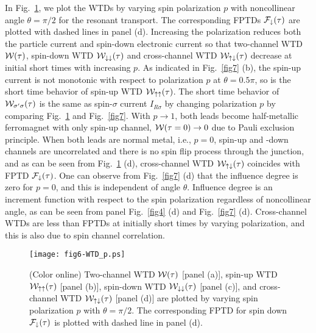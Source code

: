 \documentclass[aps,prb,twocolumn,footinbib,showpacs,superscriptaddress,preprintnumbers,amsmath,amssymb]{revtex4-1}
\begin{document}
	In Fig.~\ref{fig6}, we plot the WTDs by varying spin polarization $p$ with noncollinear angle $\theta=\pi/2$ for the resonant transport. The corresponding FPTDs ${\cal F}_{\downarrow}(\tau)$ are plotted with dashed lines in panel (d). Increasing the polarization reduces both the particle current and spin-down electronic current so that two-channel WTD ${\cal W}(\tau)$, spin-down WTD ${\cal W}_{\downarrow\downarrow}(\tau)$ and cross-channel WTD ${\cal W}_{\uparrow\downarrow}(\tau)$ decrease at initial short times with increasing $p$. As indicated in Fig.~\ref{fig7} (b), the spin-up current is not monotonic with respect to polarization $p$ at $\theta=0.5\pi$, so is the short time behavior of spin-up WTD ${\cal W}_{\uparrow\uparrow}(\tau)$. The short time behavior of ${\cal W}_{\sigma'\sigma}(\tau)$ is the same as spin-$\sigma$ current $I_{R\sigma}$ by changing polarization $p$ by comparing Fig.~\ref{fig6} and Fig.~\ref{fig7}. 
	With $p\rightarrow 1$, both leads become half-metallic ferromagnet with only spin-up channel, ${\cal W}(\tau=0) \rightarrow 0$ due to Pauli exclusion principle. When both leads are normal metal, i.e., $p=0$, spin-up and -down channels are uncorrelated and there is no spin flip process through the junction, and as can be seen from Fig.~\ref{fig6} (d), cross-channel WTD ${\cal W}_{\uparrow\downarrow}(\tau)$ coincides with FPTD ${\cal F}_{\downarrow}(\tau)$. One can observe from  Fig.~\ref{fig7} (d) that the influence degree is zero for $p=0$, and this is independent of angle $\theta$. 
	Influence degree is an increment function with respect to the spin polarization regardless of noncollinear angle, as can be seen from panel Fig.~\ref{fig4} (d) and Fig.~\ref{fig7} (d). Cross-channel WTDs are less than FPTDs at initially short times by varying polarization, and this is also due to spin channel correlation. 


\begin{figure}
\centering
  \texttt{[image: fig6-WTD\_p.ps]} \\
  \caption{(Color online)  Two-channel WTD ${\cal W}(\tau)$ [panel (a)], spin-up WTD ${\cal W}_{\uparrow\uparrow}(\tau)$ [panel (b)], spin-down WTD ${\cal W}_{\downarrow\downarrow}(\tau)$ [panel (c)], and cross-channel WTD ${\cal W}_{\uparrow\downarrow}(\tau)$ [panel (d)] are plotted by varying spin polarization $p$ with $\theta=\pi/2$. 
The corresponding FPTD for spin down ${\cal F}_{\downarrow}(\tau)$ is plotted with dashed line in panel (d). }
  \label{fig6}
\end{figure}
\end{document}
